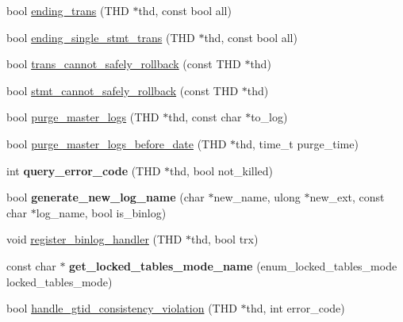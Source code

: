 \begin{DoxyCompactItemize}
\item 
bool \mbox{\hyperlink{group__Binary__Log_gaad02774240e19d361a32bd35c9db60cb}{ending\+\_\+trans}} (T\+HD $\ast$thd, const bool all)
\item 
bool \mbox{\hyperlink{group__Binary__Log_ga80a5419e22b84b8ca2f3595cbf75fa67}{ending\+\_\+single\+\_\+stmt\+\_\+trans}} (T\+HD $\ast$thd, const bool all)
\item 
bool \mbox{\hyperlink{group__Binary__Log_ga1d647f955254c565dc33abf8caabdbab}{trans\+\_\+cannot\+\_\+safely\+\_\+rollback}} (const T\+HD $\ast$thd)
\item 
bool \mbox{\hyperlink{group__Binary__Log_ga07a668f531f059316c8f17dfcecfd465}{stmt\+\_\+cannot\+\_\+safely\+\_\+rollback}} (const T\+HD $\ast$thd)
\item 
bool \mbox{\hyperlink{group__Binary__Log_ga1f15ff584adebd77fd1bf4ebc88a68b6}{purge\+\_\+master\+\_\+logs}} (T\+HD $\ast$thd, const char $\ast$to\+\_\+log)
\item 
bool \mbox{\hyperlink{group__Binary__Log_ga38f8e56905c5205bb8cf6268cd203cb2}{purge\+\_\+master\+\_\+logs\+\_\+before\+\_\+date}} (T\+HD $\ast$thd, time\+\_\+t purge\+\_\+time)
\item 
\mbox{\label{group__Binary__Log_ga30ae6bafee492a4342e739018cfb6701}} 
int {\bfseries query\+\_\+error\+\_\+code} (T\+HD $\ast$thd, bool not\+\_\+killed)
\item 
\mbox{\label{group__Binary__Log_gaa811388f8ef0ea459d4adc40b65ff68e}} 
bool {\bfseries generate\+\_\+new\+\_\+log\+\_\+name} (char $\ast$new\+\_\+name, ulong $\ast$new\+\_\+ext, const char $\ast$log\+\_\+name, bool is\+\_\+binlog)
\item 
void \mbox{\hyperlink{group__Binary__Log_ga53bb73d56883af0d06d664f19407eac1}{register\+\_\+binlog\+\_\+handler}} (T\+HD $\ast$thd, bool trx)
\item 
\mbox{\label{group__Binary__Log_ga3295f355d2560a45872262e211b0d83c}} 
const char $\ast$ {\bfseries get\+\_\+locked\+\_\+tables\+\_\+mode\+\_\+name} (enum\+\_\+locked\+\_\+tables\+\_\+mode locked\+\_\+tables\+\_\+mode)
\item 
bool \mbox{\hyperlink{group__Binary__Log_ga9f038ff4067e3f5be2b4dacc1e50ac72}{handle\+\_\+gtid\+\_\+consistency\+\_\+violation}} (T\+HD $\ast$thd, int error\+\_\+code)
\item 
\mbox{\label{group__Binary__Log_ga5af09c853f5dcd42347e8343a0ccbc2b}} 

\end{DoxyCompactItemize}
